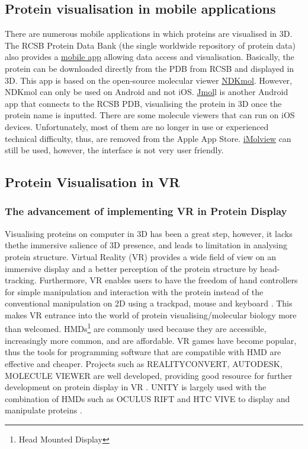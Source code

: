  \subsection{Protein visualisation in mobile applications}

There are numerous mobile applications in which proteins are visualised in 3D. The RCSB Protein Data Bank (the single worldwide repository of protein data) also provides a \href{https://www.ncbi.nlm.nih.gov/pmc/articles/PMC4271143/}{mobile app} allowing data access and visualisation. Basically, the protein can be downloaded directly from the PDB from RCSB and displayed in 3D. This app is based on the open-source molecular viewer \href{https://play.google.com/store/apps/details?id=jp.sfjp.webglmol.NDKmol&hl=en}{NDKmol}. However, NDKmol can only be used on Android and not iOS. \href{https://www.imedicalapps.com/2013/08/jmol-molecular-visualization-app/}{Jmol}l is another Android app that connects to the RCSB PDB, visualising the protein in 3D once the protein name is inputted.
There are some molecule viewers that can run on iOS devices. Unfortunately, most of them are no longer in use or experienced technical difficulty, thus, are removed from the Apple App Store. \href{https://www.molsoft.com/iMolview.html}{iMolview} can still be used, however, the interface is not very user friendly. 


\subsection{Protein Visualisation in VR}
\subsubsection{The advancement of implementing VR in Protein Display}
Visualising proteins on computer in 3D has been a great step, however, it lacks thethe immersive salience of 3D presence, and leads to limitation in analysing protein structure. Virtual Reality (VR) provides a wide field of view on an immersive display and a better perception of the protein structure by head-tracking. Furthermore, VR enables users to have the freedom of hand controllers for simple manipulation and interaction with the protein instead of the conventional manipulation on 2D using a trackpad, mouse and keyboard \parencite{goddard_molecular_2018}. This makes VR entrance into the world of protein visualising/molecular biology more than welcomed. 
HMDs\footnote{Head Mounted Display} are commonly used because they are accessible, increasingly more common, and are affordable. VR games have become popular, thus the tools for programming software that are compatible with HMD are effective and cheaper. Projects such as {\footnotesize REALITYCONVERT}, {\footnotesize AUTODESK}, {\footnotesize MOLECULE VIEWER} are well developed, providing good resource for further development on protein display in VR \parencite{ratamero_touching_2018}. {\footnotesize UNITY} is largely used with the combination of HMDs such as {\footnotesize OCULUS RIFT} and {\footnotesize HTC VIVE} to display and manipulate proteins \parencite{ratamero_touching_2018}.

